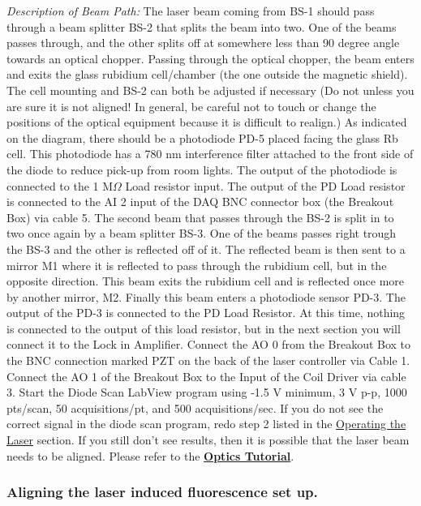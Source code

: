 \documentclass{../lab}
\begin{document}
\emph{Description of Beam Path:} The laser beam coming from BS-1 should pass through a beam splitter BS-2 that splits the beam into two. One of the beams passes through, and the other splits off at somewhere less than 90 degree angle towards an optical chopper. Passing through the optical chopper, the beam enters and exits the glass rubidium cell/chamber (the one outside the magnetic shield). The cell mounting and BS-2 can both be adjusted if necessary (Do not unless you are sure it is not aligned! In general, be careful not to touch or change the positions of the optical equipment because it is difficult to realign.) As indicated on the diagram, there should be a photodiode PD-5 placed facing the glass Rb cell. This photodiode has a 780 nm interference filter attached to the front side of the diode to reduce pick-up from room lights. The output of the photodiode is connected to the 1 M$\Omega$ Load resistor input. The output of the PD Load resistor is connected to the AI 2 input of the DAQ BNC connector box (the Breakout Box) via cable 5. The second beam that passes through the BS-2 is split in to two once again by a beam splitter BS-3. One of the beams passes right trough the BS-3 and the other is reflected off of it. The reflected beam is then sent to a mirror M1 where it is reflected to pass through the rubidium cell, but in the opposite direction. This beam exits the rubidium cell and is reflected once more by another mirror, M2. Finally this beam enters a photodiode sensor PD-3. The output of the PD-3 is connected to the PD Load Resistor. At this time, nothing is connected to the output of this load resistor, but in the next section you will connect it to the Lock in Amplifier. Connect the AO 0 from the Breakout Box to the BNC connection marked PZT on the back of the laser controller via Cable 1. Connect the AO 1 of the Breakout Box to the Input of the Coil Driver via cable 3. Start the Diode Scan LabView program using -1.5 V minimum, 3 V p-p, 1000 pts/scan, 50 acquisitions/pt, and 500 acquisitions/sec. If you do not see the correct signal in the diode scan program, redo step 2 listed in the \hyperref[subsubsec:OperatingTheLaser]{Operating the Laser} section. If you still don't see results, then it is possible that the laser beam needs to be aligned. Please refer to the \href{https://berkeley-physics111b.github.io/appendices/OpticsTutorial/}{\textbf{Optics Tutorial}}.

\newpage

\subsubsection{Aligning the laser induced fluorescence set up.}
\end{document}
